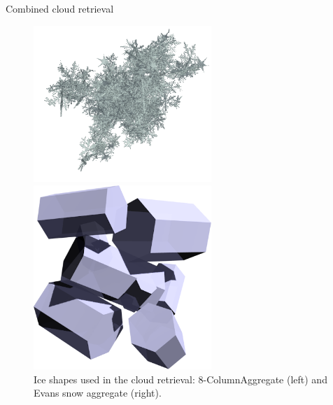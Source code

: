 \documentclass[final,hyperref={pdfpagelabels=false}]{beamer}
\begin{document}
\begin{frame}
\begin{columns}[t]
\begin{column}{.48\linewidth}
\begin{block}{Combined cloud retrieval}
           \begin{figure}
             \centering
           \begin{minipage}{0.8\textwidth}
             \begin{minipage}{0.5\textwidth}
               \includegraphics[width = 0.6\textwidth]{../plots/evans_snow_aggregate}
             \end{minipage}\hfill%
             \begin{minipage}{0.5\textwidth}
               \includegraphics[width = 0.6\textwidth]{../plots/8column_aggregate}
             \end{minipage}
           \end{minipage}
           \caption{Ice shapes used in the cloud retrieval: 8-ColumnAggregate (left)
                    and Evans snow aggregate (right).}
           \end{figure}

        \end{block}

    \end{column}


\end{columns}
\end{frame}
\end{document}
